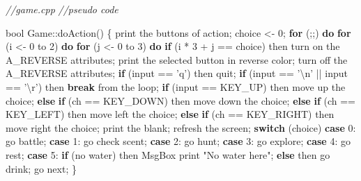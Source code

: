 \documentclass[hyperref,UTF8,a4paper]{ctexart}
\newenvironment{Shaded}{}{}
\newcommand{\CharTok}[1]{\textcolor[rgb]{0.25,0.44,0.63}{#1}}
\newcommand{\CommentTok}[1]{\textcolor[rgb]{0.38,0.63,0.69}{\textit{#1}}}
\newcommand{\ControlFlowTok}[1]{\textcolor[rgb]{0.00,0.44,0.13}{\textbf{#1}}}
\newcommand{\DataTypeTok}[1]{\textcolor[rgb]{0.56,0.13,0.00}{#1}}
\newcommand{\DecValTok}[1]{\textcolor[rgb]{0.25,0.63,0.44}{#1}}
\newcommand{\NormalTok}[1]{#1}
\newcommand{\SpecialCharTok}[1]{\textcolor[rgb]{0.25,0.44,0.63}{#1}}
\newcommand{\StringTok}[1]{\textcolor[rgb]{0.25,0.44,0.63}{#1}}
\begin{document}
\begin{Shaded}
\begin{Highlighting}[]
\CommentTok{//game.cpp}
\CommentTok{//pseudo code}

\DataTypeTok{bool}\NormalTok{ Game::doAction()}
\NormalTok{\{}
\NormalTok{    print the buttons of action;}
\NormalTok{    choice <- }\DecValTok{0}\NormalTok{;}
    \ControlFlowTok{for}\NormalTok{ (;;) }\ControlFlowTok{do}
        \ControlFlowTok{for}\NormalTok{ (i <- }\DecValTok{0}\NormalTok{ to }\DecValTok{2}\NormalTok{) }\ControlFlowTok{do}
            \ControlFlowTok{for}\NormalTok{ (j <- }\DecValTok{0}\NormalTok{ to }\DecValTok{3}\NormalTok{) }\ControlFlowTok{do}
                \ControlFlowTok{if}\NormalTok{ (i * }\DecValTok{3}\NormalTok{ + j == choice) then}
\NormalTok{                    turn on the A_REVERSE attributes;}
\NormalTok{                print the selected button in reverse color;}
\NormalTok{                turn off the A_REVERSE attributes;}
        \ControlFlowTok{if}\NormalTok{ (input == }\CharTok{'q'}\NormalTok{) then}
\NormalTok{            quit;}
        \ControlFlowTok{if}\NormalTok{ (input == }\CharTok{'}\SpecialCharTok{\textbackslash{}n}\CharTok{'}\NormalTok{ || input == }\CharTok{'}\SpecialCharTok{\textbackslash{}r}\CharTok{'}\NormalTok{) then}
            \ControlFlowTok{break}\NormalTok{ from the loop;}
        \ControlFlowTok{if}\NormalTok{ (input == KEY_UP) then}
\NormalTok{            move up the choice;}
        \ControlFlowTok{else} \ControlFlowTok{if}\NormalTok{ (ch == KEY_DOWN) then}
\NormalTok{            move down the choice;}
        \ControlFlowTok{else} \ControlFlowTok{if}\NormalTok{ (ch == KEY_LEFT) then}
\NormalTok{            move left the choice;}
        \ControlFlowTok{else} \ControlFlowTok{if}\NormalTok{ (ch == KEY_RIGHT) then}
\NormalTok{            move right the choice;}
\NormalTok{        print the blank;}
\NormalTok{        refresh the screen;}
    \ControlFlowTok{switch}\NormalTok{ (choice)}
        \ControlFlowTok{case} \DecValTok{0}\NormalTok{: go battle;}
        \ControlFlowTok{case} \DecValTok{1}\NormalTok{: go check scent;}
        \ControlFlowTok{case} \DecValTok{2}\NormalTok{: go hunt;}
        \ControlFlowTok{case} \DecValTok{3}\NormalTok{: go explore;}
        \ControlFlowTok{case} \DecValTok{4}\NormalTok{: go rest;}
        \ControlFlowTok{case} \DecValTok{5}\NormalTok{:}
        \ControlFlowTok{if}\NormalTok{ (no water) then}
\NormalTok{            MsgBox print }\StringTok{"No water here"}\NormalTok{;}
        \ControlFlowTok{else}\NormalTok{ then}
\NormalTok{            go drink;}
\NormalTok{    go next;}
\NormalTok{\}}
\end{Highlighting}
\end{Shaded}
\end{document}
